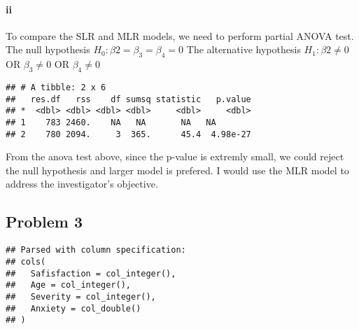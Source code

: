 \documentclass[]{article}
\newenvironment{Shaded}{\begin{snugshade}}{\end{snugshade}}
\newcommand{\KeywordTok}[1]{\textcolor[rgb]{0.13,0.29,0.53}{\textbf{#1}}}
\newcommand{\DataTypeTok}[1]{\textcolor[rgb]{0.13,0.29,0.53}{#1}}
\newcommand{\DecValTok}[1]{\textcolor[rgb]{0.00,0.00,0.81}{#1}}
\newcommand{\StringTok}[1]{\textcolor[rgb]{0.31,0.60,0.02}{#1}}
\newcommand{\OperatorTok}[1]{\textcolor[rgb]{0.81,0.36,0.00}{\textbf{#1}}}
\newcommand{\NormalTok}[1]{#1}
\let\oldparagraph\paragraph
\renewcommand{\paragraph}[1]{\oldparagraph{#1}\mbox{}}
\begin{document}
\paragraph{ii}\label{ii}

To compare the SLR and MLR models, we need to perform partial ANOVA
test. The null hypothesis
\(H_{0}: \beta{2} = \beta_{3} = \beta_{4} = 0\) The alternative
hypothesis \(H_{1}: \beta{2} \neq 0\) OR \(\beta_{3} \neq 0\) OR
\(\beta_{4} \neq 0\)

\begin{Shaded}
\end{Shaded}

\begin{verbatim}
## # A tibble: 2 x 6
##   res.df   rss    df sumsq statistic   p.value
## *  <dbl> <dbl> <dbl> <dbl>     <dbl>     <dbl>
## 1    783 2460.    NA   NA       NA   NA       
## 2    780 2094.     3  365.      45.4  4.98e-27
\end{verbatim}

From the anova test above, since the p-value is extremly small, we could
reject the null hypothesis and larger model is prefered. I would use the
MLR model to address the investigator's objective.

\subsection{Problem 3}\label{problem-3}

\begin{Shaded}
\end{Shaded}

\begin{verbatim}
## Parsed with column specification:
## cols(
##   Safisfaction = col_integer(),
##   Age = col_integer(),
##   Severity = col_integer(),
##   Anxiety = col_double()
## )
\end{verbatim}
\end{document}
